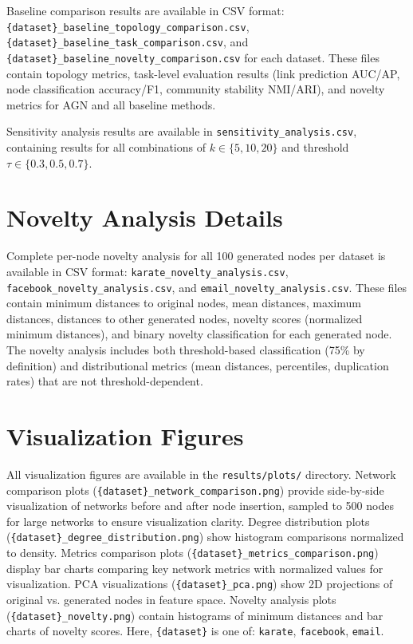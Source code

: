 \documentclass[12pt]{article}
\begin{document}
Baseline comparison results are available in CSV format: \texttt{\{dataset\}\_baseline\_topology\_comparison.csv}, \texttt{\{dataset\}\_baseline\_task\_comparison.csv}, and \texttt{\{dataset\}\_baseline\_novelty\_comparison.csv} for each dataset. These files contain topology metrics, task-level evaluation results (link prediction AUC/AP, node classification accuracy/F1, community stability NMI/ARI), and novelty metrics for AGN and all baseline methods.

Sensitivity analysis results are available in \texttt{sensitivity\_analysis.csv}, containing results for all combinations of $k \in \{5, 10, 20\}$ and threshold $\tau \in \{0.3, 0.5, 0.7\}$.

\section{Novelty Analysis Details}

Complete per-node novelty analysis for all 100 generated nodes per dataset is available in CSV format: \texttt{karate\_novelty\_analysis.csv}, \texttt{facebook\_novelty\_analysis.csv}, and \texttt{email\_novelty\_analysis.csv}. These files contain minimum distances to original nodes, mean distances, maximum distances, distances to other generated nodes, novelty scores (normalized minimum distances), and binary novelty classification for each generated node. The novelty analysis includes both threshold-based classification (75\% by definition) and distributional metrics (mean distances, percentiles, duplication rates) that are not threshold-dependent.

\section{Visualization Figures}

All visualization figures are available in the \texttt{results/plots/} directory. Network comparison plots (\texttt{\{dataset\}\_network\_comparison.png}) provide side-by-side visualization of networks before and after node insertion, sampled to 500 nodes for large networks to ensure visualization clarity. Degree distribution plots (\texttt{\{dataset\}\_degree\_distribution.png}) show histogram comparisons normalized to density. Metrics comparison plots (\texttt{\{dataset\}\_metrics\_comparison.png}) display bar charts comparing key network metrics with normalized values for visualization. PCA visualizations (\texttt{\{dataset\}\_pca.png}) show 2D projections of original vs. generated nodes in feature space. Novelty analysis plots (\texttt{\{dataset\}\_novelty.png}) contain histograms of minimum distances and bar charts of novelty scores. Here, \texttt{\{dataset\}} is one of: \texttt{karate}, \texttt{facebook}, \texttt{email}.
\end{document}
